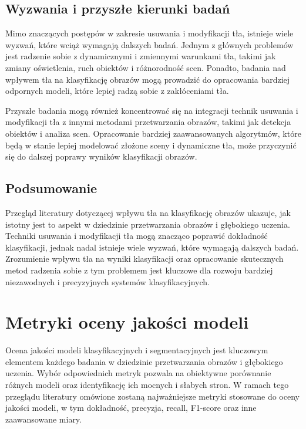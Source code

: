\subsection*{Wyzwania i przyszłe kierunki badań}

Mimo znaczących postępów w zakresie usuwania i modyfikacji tła, istnieje wiele wyzwań, które wciąż 
wymagają dalszych badań. Jednym z głównych problemów jest radzenie sobie z dynamicznymi i zmiennymi 
warunkami tła, takimi jak zmiany oświetlenia, ruch obiektów i różnorodność scen. Ponadto, badania nad 
wpływem tła na klasyfikację obrazów mogą prowadzić do opracowania bardziej odpornych modeli, które 
lepiej radzą sobie z zakłóceniami tła.

Przyszłe badania mogą również koncentrować się na integracji technik usuwania i modyfikacji tła z 
innymi metodami przetwarzania obrazów, takimi jak detekcja obiektów i analiza scen. Opracowanie 
bardziej zaawansowanych algorytmów, które będą w stanie lepiej modelować złożone sceny i dynamiczne 
tła, może przyczynić się do dalszej poprawy wyników klasyfikacji obrazów.

\subsection*{Podsumowanie}

Przegląd literatury dotyczącej wpływu tła na klasyfikację obrazów ukazuje, jak istotny jest to 
aspekt w dziedzinie przetwarzania obrazów i głębokiego uczenia. Techniki usuwania i modyfikacji 
tła mogą znacząco poprawić dokładność klasyfikacji, jednak nadal istnieje wiele wyzwań, które 
wymagają dalszych badań. Zrozumienie wpływu tła na wyniki klasyfikacji oraz opracowanie skutecznych 
metod radzenia sobie z tym problemem jest kluczowe dla rozwoju bardziej niezawodnych i precyzyjnych 
systemów klasyfikacyjnych.

\section*{Metryki oceny jakości modeli}

Ocena jakości modeli klasyfikacyjnych i segmentacyjnych jest kluczowym elementem każdego badania w 
dziedzinie przetwarzania obrazów i głębokiego uczenia. Wybór odpowiednich metryk pozwala na obiektywne 
porównanie różnych modeli oraz identyfikację ich mocnych i słabych stron. W ramach tego przeglądu 
literatury omówione zostaną najważniejsze metryki stosowane do oceny jakości modeli, w tym dokładność, 
precyzja, recall, F1-score oraz inne zaawansowane miary. \cite{metrtics}

